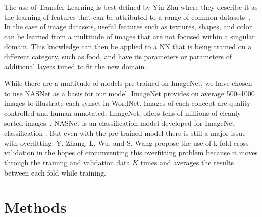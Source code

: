 \documentclass[conference]{IEEEtran}
\begin{document}
The use of Transfer Learning is best defined by Yin Zhu where they describe it as the learning of features that can be attributed to a range of common datasets~\cite{Tlearning}. In the case of image datasets, useful features such as textures, shapes, and color can be learned from a multitude of images that are not focused within a singular domain. This knowledge can then be applied to a NN that is being trained on a different category, such as food, and have its parameters or parameters of additional layers tuned to fit the new domain.
 
 While there are a multitude of models pre-trained on ImageNet, we have chosen to use NASNet as a basis for our model. ImageNet provides on average 500–1000 images to illustrate each synset in WordNet. Images of each concept are quality-controlled and human-annotated. ImageNet, offers tens of millions of cleanly sorted images~\cite{ImageNet}. NASNet is an classification model developed for ImageNet classification \cite{NASNetDef}. But even with the pre-trained model there is still a major issue with overfitting. Y. Zhang, L. Wu, and S. Wang propose the use of k-fold cross validation in the hopes of circumventing this overfitting problem because it moves through the training and validation data $K$ times and averages the results between each fold while training.  
 

\section{Methods}
\end{document}
